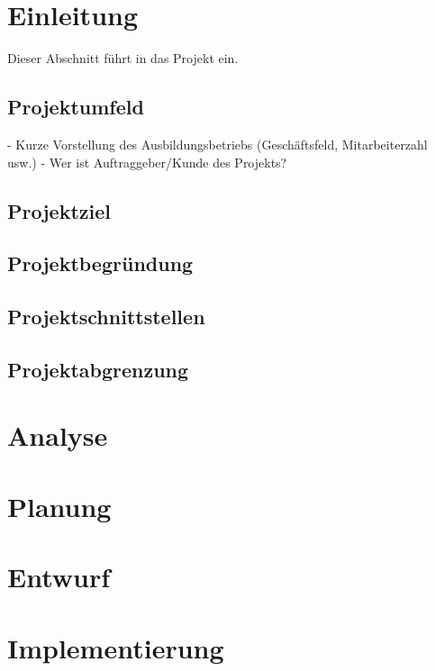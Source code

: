 \documentclass{article}
\begin{document}
\newpage
\tableofcontents
\newpage

\newpage
\listoffigures
\newpage


\section{Einleitung}
Dieser Abschnitt führt in das Projekt ein.

\subsection{Projektumfeld}
- Kurze Vorstellung des Ausbildungsbetriebs (Geschäftsfeld, Mitarbeiterzahl usw.) \linebreak
- Wer ist Auftraggeber/Kunde des Projekts?

\subsection{Projektziel}

\subsection{Projektbegründung}

\subsection{Projektschnittstellen}

\subsection{Projektabgrenzung}

\section{Analyse}

\section{Planung}

\section{Entwurf}

\section{Implementierung}
\end{document}
